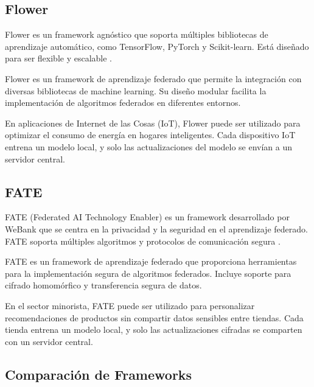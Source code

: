 \subsection{Flower}
Flower es un framework agnóstico que soporta múltiples bibliotecas de aprendizaje automático, como TensorFlow, PyTorch y Scikit-learn. Está diseñado para ser flexible y escalable \cite{beutel2020flower}.

\begin{definition}[Flower]
	Flower es un framework de aprendizaje federado que permite la integración con diversas bibliotecas de machine learning. Su diseño modular facilita la implementación de algoritmos federados en diferentes entornos.
\end{definition}

\begin{example}
	En aplicaciones de Internet de las Cosas (IoT), Flower puede ser utilizado para optimizar el consumo de energía en hogares inteligentes. Cada dispositivo IoT entrena un modelo local, y solo las actualizaciones del modelo se envían a un servidor central.
\end{example}

\subsection{FATE}
FATE (Federated AI Technology Enabler) es un framework desarrollado por WeBank que se centra en la privacidad y la seguridad en el aprendizaje federado. FATE soporta múltiples algoritmos y protocolos de comunicación segura \cite{meng2020fate}.

\begin{definition}[FATE]
	FATE es un framework de aprendizaje federado que proporciona herramientas para la implementación segura de algoritmos federados. Incluye soporte para cifrado homomórfico y transferencia segura de datos.
\end{definition}

\begin{example}
	En el sector minorista, FATE puede ser utilizado para personalizar recomendaciones de productos sin compartir datos sensibles entre tiendas. Cada tienda entrena un modelo local, y solo las actualizaciones cifradas se comparten con un servidor central.
\end{example}

\subsection{Comparación de Frameworks}

